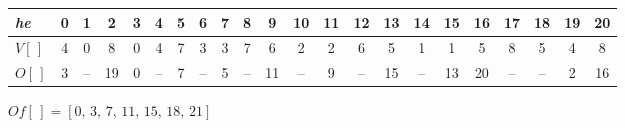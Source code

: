 \begin{tabular}{lccccccccccccccccccccc}
\textit{he} & 0 & 1 & 2 & 3 & 4 & 5 & 6 & 7 & 8 & 9 & 10 & 11 & 12 & 13 & 14 & 15 & 16 & 17 & 18 & 19 & 20 \\ \hline
$V[\,]$ & 4 & 0 & 8 & 0 & 4 & 7 & 3 & 3 & 7 & 6 & 2 & 2 & 6 & 5 & 1 & 1 & 5 & 8 & 5 & 4 & 8 \\
$O[\,]$ & 3 & -- & 19 & 0 & -- & 7 & -- & 5 & -- & 11 & -- & 9 & -- & 15 & -- & 13 & 20 & -- & -- & 2 & 16 \\
\end{tabular}
\par\medskip $Of[\,] = [0,\,3,\,7,\,11,\,15,\,18,\,21]$
